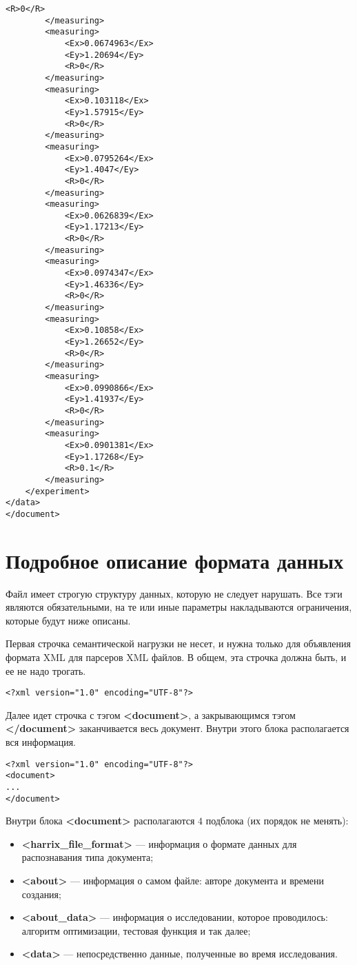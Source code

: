 \documentclass[a4paper,12pt]{article}
\begin{document}
\begin{lstlisting}[label=Example01,caption=Пример части файла Harrix Optimization Testing]
			<R>0</R>
		</measuring>
		<measuring>
			<Ex>0.0674963</Ex>
			<Ey>1.20694</Ey>
			<R>0</R>
		</measuring>
		<measuring>
			<Ex>0.103118</Ex>
			<Ey>1.57915</Ey>
			<R>0</R>
		</measuring>
		<measuring>
			<Ex>0.0795264</Ex>
			<Ey>1.4047</Ey>
			<R>0</R>
		</measuring>
		<measuring>
			<Ex>0.0626839</Ex>
			<Ey>1.17213</Ey>
			<R>0</R>
		</measuring>
		<measuring>
			<Ex>0.0974347</Ex>
			<Ey>1.46336</Ey>
			<R>0</R>
		</measuring>
		<measuring>
			<Ex>0.10858</Ex>
			<Ey>1.26652</Ey>
			<R>0</R>
		</measuring>
		<measuring>
			<Ex>0.0990866</Ex>
			<Ey>1.41937</Ey>
			<R>0</R>
		</measuring>
		<measuring>
			<Ex>0.0901381</Ex>
			<Ey>1.17268</Ey>
			<R>0.1</R>
		</measuring>
	</experiment>
</data>
</document>
\end{lstlisting}

\section{Подробное описание формата данных}

Файл имеет строгую структуру данных, которую не следует нарушать. Все тэги являются обязательными, на те или иные параметры накладываются ограничения, которые будут ниже описаны.

Первая строчка семантической нагрузки не несет, и нужна только для объявления формата XML для парсеров XML файлов. В общем, эта строчка должна быть, и ее не надо трогать.

\begin{lstlisting}[label=Part01,caption=Первая строчка файла Harrix Optimization Testing]
<?xml version="1.0" encoding="UTF-8"?>
\end{lstlisting}

Далее идет строчка с тэгом \textbf{<document>}, а закрывающимся тэгом \textbf{</document>} заканчивается весь документ. Внутри этого блока располагается вся информация.

\begin{lstlisting}[label=Part02,caption=Блок <document> в файле Harrix Optimization Testing]
<?xml version="1.0" encoding="UTF-8"?>
<document>
...
</document>
\end{lstlisting}

Внутри блока \textbf{<document>} располагаются $ 4 $ подблока (их порядок не менять):
\begin{itemize}
\item \textbf{<harrix\_file\_format>} --- информация о формате данных для распознавания типа документа;
\item \textbf{<about>} --- информация о самом файле:  авторе документа и времени создания;
\item \textbf{<about\_data>} --- информация о исследовании, которое проводилось: алгоритм оптимизации, тестовая функция и так далее;
\item \textbf{<data>} --- непосредственно данные, полученные во время исследования.
\end{itemize}
\end{document}
